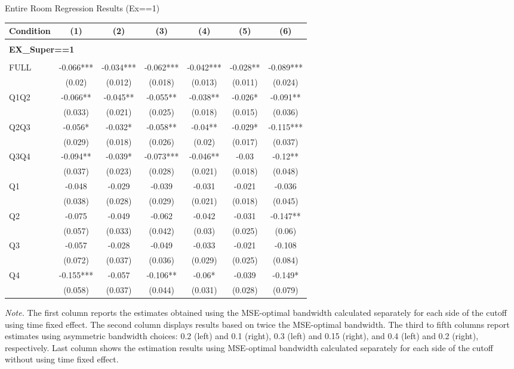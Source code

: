 \begin{table}[]
\TABLE
{Entire Room Regression Results (Ex==1) \label{result_detail1}}{\begin{tabular}{lcccccc}
\hline
Condition & (1) & (2) & (3) & (4) & (5) & (6) \\ \hline
\\ 
\multicolumn{5}{l}{\textbf{EX\_Super==1}} \\ 
\\ 
FULL & -0.066*** & -0.034*** & -0.062*** & -0.042*** & -0.028** & -0.089*** \\ 
&(0.02)&(0.012) & (0.018)&(0.013)&(0.011)&(0.024)\\ 
Q1Q2 & -0.066** & -0.045** & -0.055** & -0.038** & -0.026* & -0.091** \\ 
&(0.033)&(0.021) & (0.025)&(0.018)&(0.015)&(0.036)\\ 
Q2Q3 & -0.056* & -0.032* & -0.058** & -0.04** & -0.029* & -0.115*** \\ 
&(0.029)&(0.018) & (0.026)&(0.02)&(0.017)&(0.037)\\ 
Q3Q4 & -0.094** & -0.039* & -0.073*** & -0.046** & -0.03 & -0.12** \\ 
&(0.037)&(0.023) & (0.028)&(0.021)&(0.018)&(0.048)\\ 
Q1 & -0.048 & -0.029 & -0.039 & -0.031 & -0.021 & -0.036 \\ 
&(0.038)&(0.028) & (0.029)&(0.021)&(0.018)&(0.045)\\ 
Q2 & -0.075 & -0.049 & -0.062 & -0.042 & -0.031 & -0.147** \\ 
&(0.057)&(0.033) & (0.042)&(0.03)&(0.025)&(0.06)\\ 
Q3 & -0.057 & -0.028 & -0.049 & -0.033 & -0.021 & -0.108 \\ 
&(0.072)&(0.037) & (0.036)&(0.029)&(0.025)&(0.084)\\ 
Q4 & -0.155*** & -0.057 & -0.106** & -0.06* & -0.039 & -0.149* \\ 
&(0.058)&(0.037) & (0.044)&(0.031)&(0.028)&(0.079)\\ 
\hline 
\end{tabular}}{\textit{Note.} The first column reports the estimates obtained using the MSE-optimal bandwidth calculated separately for each side of the cutoff using time fixed effect. The second column displays results based on twice the MSE-optimal bandwidth. The third to fifth columns report estimates using asymmetric bandwidth choices: 0.2 (left) and 0.1 (right), 0.3 (left) and 0.15 (right), and 0.4 (left) and 0.2 (right), respectively. Last column shows the estimation results using MSE-optimal bandwidth calculated separately for each side of the cutoff without using time fixed effect.}
\end{table}

